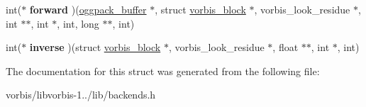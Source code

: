 \begin{DoxyCompactItemize}
\item 
\hypertarget{structvorbis__func__residue_ae897a760e0d921d9d65cd8c4d7c6882f}{int($\ast$ {\bfseries forward} )(\hyperlink{structoggpack__buffer}{oggpack\+\_\+buffer} $\ast$, struct \hyperlink{structvorbis__block}{vorbis\+\_\+block} $\ast$, vorbis\+\_\+look\+\_\+residue $\ast$, int $\ast$$\ast$, int $\ast$, int, long $\ast$$\ast$, int)}\label{structvorbis__func__residue_ae897a760e0d921d9d65cd8c4d7c6882f}

\item 
\hypertarget{structvorbis__func__residue_a706489740593a947d37c7444e1019949}{int($\ast$ {\bfseries inverse} )(struct \hyperlink{structvorbis__block}{vorbis\+\_\+block} $\ast$, vorbis\+\_\+look\+\_\+residue $\ast$, float $\ast$$\ast$, int $\ast$, int)}\label{structvorbis__func__residue_a706489740593a947d37c7444e1019949}

\end{DoxyCompactItemize}


The documentation for this struct was generated from the following file\+:\begin{DoxyCompactItemize}
\item 
vorbis/libvorbis-\/1../lib/backends.\+h\end{DoxyCompactItemize}
